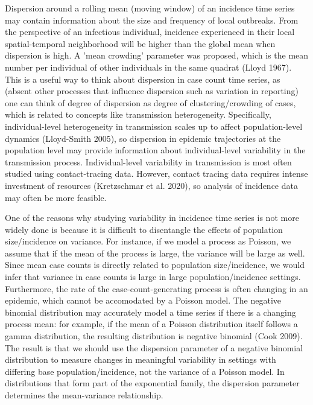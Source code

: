\documentclass[10pt,letterpaper]{article}
\begin{document}
Dispersion around a rolling mean (moving window) of an incidence time series may contain information about the size and frequency of local outbreaks. From the perspective of an infectious individual, incidence experienced in their local spatial-temporal neighborhood will be higher than the global mean when dispersion is high. A 'mean crowding' parameter was proposed, which is the mean number per individual of other individuals in the same quadrat (Lloyd 1967). This is a useful way to think about dispersion in case count time series, as (absent other processes that influence dispersion such as variation in reporting) one can think of degree of dispersion as degree of clustering/crowding of cases, which is related to concepts like transmission heterogeneity. Specifically, individual-level heterogeneity in transmission scales up to affect population-level dynamics (Lloyd-Smith 2005), so dispersion in epidemic trajectories at the population level may provide information about individual-level variability in the transmission process. Individual-level variability in transmission is most often studied using contact-tracing data. However, contact tracing data requires intense investment of resources (Kretzschmar et al. 2020), so analysis of incidence data may often be more feasible. 

One of the reasons why studying variability in incidence time series is not more widely done is because it is difficult to disentangle the effects of population size/incidence on variance. For instance, if we model a process as Poisson, we assume that if the mean of the process is large, the variance will be large as well. Since mean case counts is directly related to population size/incidence, we would infer that variance in case counts is large in large population/incidence settings. Furthermore, the rate of the case-count-generating process is often changing in an epidemic, which cannot be accomodated by a Poisson model. The negative binomial distribution may accurately model a time series if there is a changing process mean: for example, if the mean of a Poisson distribution itself follows a gamma distribution, the resulting distribution is negative binomial (Cook 2009). The result is that we should use the dispersion parameter of a negative binomial distribution to measure changes in meaningful variability in settings with differing base population/incidence, not the variance of a Poisson model. In distributions that form part of the exponential family, the dispersion parameter determines the mean-variance relationship. 
\end{document}
